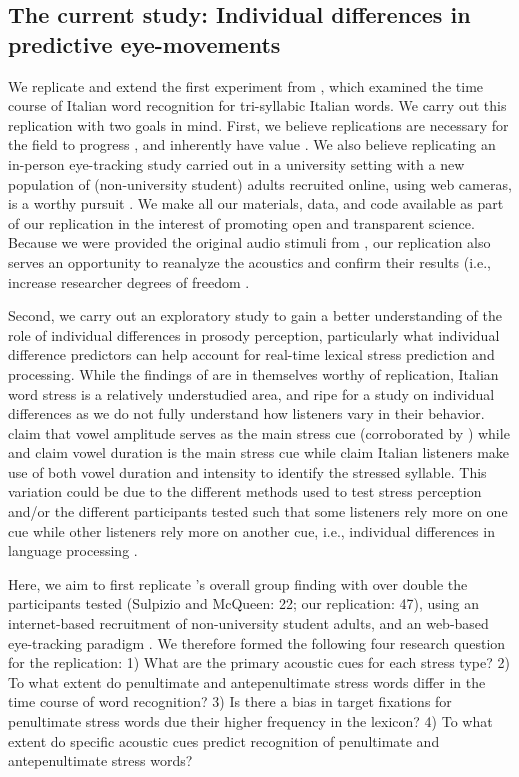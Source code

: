\subsection{The current study: Individual differences in predictive eye-movements}

We replicate and extend the first experiment from \cite{Sulpizio_McQueen_2012}, which examined the time course of Italian word recognition for tri-syllabic Italian words. We carry out this replication with two goals in mind. First, we believe replications are necessary for the field to progress \citep{Rakosi2017}, and inherently have value \citep{Kobrock2023}. We also believe replicating an in-person eye-tracking study carried out in a university setting with a new population of (non-university student) adults recruited online, using web cameras, is a worthy pursuit \citep{Prystauka_Altmann_Rothman_2023}. We make all our materials, data, and code available as part of our replication in the interest of promoting open and transparent science. Because we were provided the original audio stimuli from \cite{Sulpizio_McQueen_2012}, our replication also serves an opportunity to reanalyze the acoustics and confirm their results (i.e., increase researcher degrees of freedom \cite{Corretta2023}.

Second, we carry out an exploratory study to gain a better understanding of the role of individual differences in prosody perception, particularly what individual difference predictors can help account for real-time lexical stress prediction and processing. While the findings of \cite{Sulpizio_McQueen_2012} are in themselves worthy of replication, Italian word stress is a relatively understudied area, and ripe for a study on individual differences as we do not fully understand how listeners vary in their behavior.  \cite{Maturi1998} claim that vowel amplitude serves as the main stress cue (corroborated by \cite{Sulpizio_McQueen_2012}) while \cite{Alfano2006} and \cite{Alfano2009} claim vowel duration is the main stress cue while \cite{Tagliapietra2005} claim Italian listeners make use of both vowel duration and intensity to identify the stressed syllable. This variation could be due to the different methods used to test stress perception and/or the different participants tested such that some listeners rely more on one cue while other listeners rely more on another cue, i.e., individual differences in language processing \citep{Yu2019,Kidd2018}.

Here, we aim to first replicate \cite{Sulpizio_McQueen_2012}'s overall group finding with over double the participants tested (Sulpizio and McQueen: 22; our replication: 47), using an internet-based recruitment of non-university student adults, and an web-based eye-tracking paradigm \citep{Vos_2017}. We therefore formed the following four research question for the replication: 1) What are the primary acoustic cues for each stress type? 2) To what extent do penultimate and antepenultimate stress words differ in the time course of word recognition? 3) Is there a bias in target fixations for penultimate stress words due their higher frequency in the lexicon? 4) To what extent do specific acoustic cues predict recognition of penultimate and antepenultimate stress words? 

